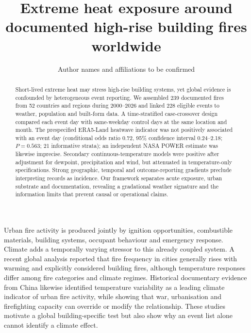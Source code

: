 \documentclass[11pt]{article}
\title{Extreme heat exposure around documented high-rise building fires worldwide}
\author{Author names and affiliations to be confirmed}
\date{}
\begin{document}
\maketitle
\linenumbers
\begin{abstract}
Short-lived extreme heat may stress high-rise building systems, yet global evidence is confounded by heterogeneous event reporting. We assembled 239 documented fires from 52 countries and regions during 2000--2026 and linked 228 eligible events to weather, population and built-form data. A time-stratified case-crossover design compared each event day with same-weekday control days at the same location and month. The prespecified ERA5-Land heatwave indicator was not positively associated with an event day (conditional odds ratio 0.72, 95\% confidence interval 0.24--2.18; $P=0.563$; 21 informative strata); an independent NASA POWER estimate was likewise imprecise. Secondary continuous-temperature models were positive after adjustment for dewpoint, precipitation and wind, but attenuated in temperature-only specifications. Strong geographic, temporal and outcome-reporting gradients preclude interpreting records as incidence. Our framework separates acute exposure, urban substrate and documentation, revealing a gradational weather signature and the information limits that prevent causal or operational claims.
\end{abstract}
Urban fire activity is produced jointly by ignition opportunities, combustible materials, building systems, occupant behaviour and emergency response. Climate adds a temporally varying stressor to this already coupled system. A recent global analysis reported that fire frequency in cities generally rises with warming and explicitly considered building fires, although temperature responses differ among fire categories and climate regimes\citep{Shi2025}. Historical documentary evidence from China likewise identified temperature variability as a leading climate indicator of urban fire activity, while showing that war, urbanisation and firefighting capacity can override or modify the relationship\citep{Yao2024}. These studies motivate a global building-specific test but also show why an event list alone cannot identify a climate effect.
\end{document}
